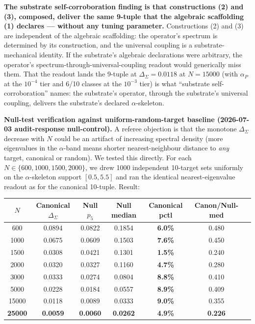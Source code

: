 \documentclass[11pt,a4paper]{amsart}
\theoremstyle{plain}
\theoremstyle{definition}
\begin{document}
\textbf{The substrate self-corroboration finding is that constructions (2) and (3), composed, deliver the same 9-tuple that the algebraic scaffolding (1) declares --- without any tuning parameter.} Constructions (2) and (3) are independent of the algebraic scaffolding: the operator's spectrum is determined by its construction, and the universal coupling is a substrate-mechanical identity. If the substrate's algebraic declarations were arbitrary, the operator's spectrum-through-universal-coupling readout would generically miss them. That the readout lands the 9-tuple at $\Delta_{\Sigma} = 0.0118$ at $N = 15000$ (with $\alpha_P$ at the $10^{-4}$ tier and 6/10 classes at the $10^{-3}$ tier) is what ``substrate self-corroboration'' names: the substrate's operator, through the substrate's universal coupling, delivers the substrate's declared $\alpha$-skeleton.

\textbf{Null-test verification against uniform-random-target baseline (2026-07-03 audit-response null-control).} A referee objection is that the monotone $\Delta_{\Sigma}$ decrease with $N$ could be an artifact of increasing spectral density (more eigenvalues in the $\alpha$-band means shorter nearest-neighbour distance to \emph{any} target, canonical or random). We tested this directly. For each $N \in \{600, 1000, 1500, 2000\}$, we drew 1000 independent 10-target sets uniformly on the $\alpha$-skeleton support $[0.5, 5.5]$ and ran the identical nearest-eigenvalue readout as for the canonical 10-tuple. Result:

\begin{center}
\begin{tabular}{ccccccc}
\toprule
$N$ & Canonical $\Delta_{\Sigma}$ & Null $p_5$ & Null median & Canonical pctl & Canon/Null-med \\
\midrule
600   & 0.0894 & 0.0822 & 0.1854 & \textbf{6.0\%} & 0.480 \\
1000  & 0.0675 & 0.0609 & 0.1503 & \textbf{7.6\%} & 0.450 \\
1500  & 0.0308 & 0.0421 & 0.1301 & \textbf{1.5\%} & 0.240 \\
2000  & 0.0320 & 0.0327 & 0.1160 & \textbf{4.7\%} & 0.280 \\
3000  & 0.0333 & 0.0274 & 0.0804 & \textbf{8.8\%} & 0.410 \\
5000  & 0.0228 & 0.0184 & 0.0557 & \textbf{8.9\%} & 0.409 \\
15000 & 0.0118 & 0.0089 & 0.0333 & \textbf{9.0\%} & 0.355 \\
\textbf{25000} & \textbf{0.0059} & \textbf{0.0060} & \textbf{0.0262} & \textbf{4.9\%} & \textbf{0.226} \\
\bottomrule
\end{tabular}
\end{center}
\end{document}
